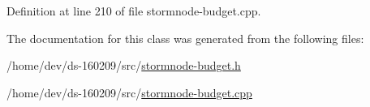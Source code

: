 Definition at line 210 of file stormnode-\/budget.\+cpp.



The documentation for this class was generated from the following files\+:\begin{DoxyCompactItemize}
\item 
/home/dev/ds-\/160209/src/\hyperlink{stormnode-budget_8h}{stormnode-\/budget.\+h}\item 
/home/dev/ds-\/160209/src/\hyperlink{stormnode-budget_8cpp}{stormnode-\/budget.\+cpp}\end{DoxyCompactItemize}

